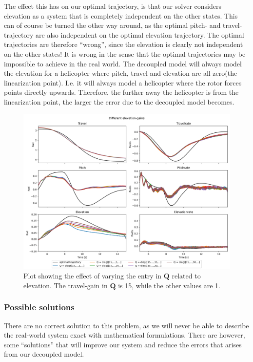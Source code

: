 \documentclass[../main.tex]{subfiles}
\begin{document}
The effect this has on our optimal trajectory, is that our solver considers elevation as a system that is completely independent on the other states. This can of course be turned the other way around, as the optimal pitch- and travel-trajectory are also independent on the optimal elevation trajectory. The optimal trajectories are therefore ``wrong'', since the elevation is clearly not independent on the other states! It is wrong in the sense that the optimal trajectories may be impossible to achieve in the real world. The decoupled model will always model the elevation for a helicopter where pitch, travel and elevation are all zero(the linearization point). I.e. it will always model a helicopter where the rotor forces points directly upwards. Therefore, the further away the helicopter is from the linearization point, the larger the error due to the decoupled model becomes. 
\begin{figure}[h]
	\centering
	\includegraphics[width=\linewidth]{figures/LAB4_elevation_gains.png}
	\caption{Plot showing the effect of varying the entry in $ \bm Q $ related to elevation. The travel-gain in $ \bm Q $ is 15, while the other values are 1.}
	\label{fig:lab4_diff_elevation_values}
\end{figure}

\subsubsection{Possible solutions}
There are no correct solution to this problem, as we will never be able to describe the real-world system exact with mathematical formulations. There are however, some ``solutions'' that will improve our system and reduce the errors that arises from our decoupled model.
\end{document}
